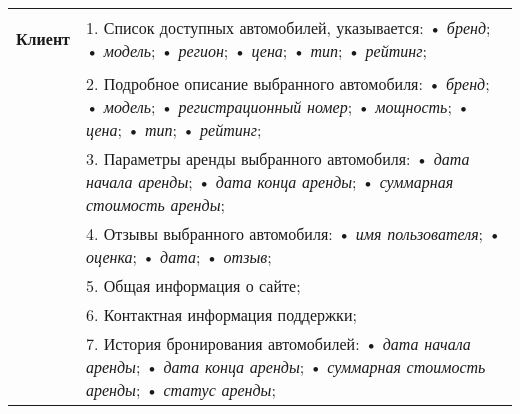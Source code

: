 \begin{longtable}{|p{0.5cm}|p{15.5cm}|}
	\begin{rotatebox}[origin=r]{90}
		{ \textbf{Клиент}}
	\end{rotatebox} 
	& 
	1. Список доступных автомобилей, указывается: \newline
	• \textit{бренд}; \newline
	• \textit{модель}; \newline
	• \textit{регион}; \newline
	• \textit{цена}; \newline
	• \textit{тип}; \newline
	• \textit{рейтинг}; \\
	\cline{2-2}
	
	&
	2. Подробное описание выбранного автомобиля: \newline
	• \textit{бренд}; \newline
	• \textit{модель}; \newline
	• \textit{регистрационный номер}; \newline
	• \textit{мощность}; \newline
	• \textit{цена}; \newline
	• \textit{тип}; \newline
	• \textit{рейтинг}; \\
	\cline{2-2}
	
	&
	3. Параметры аренды выбранного автомобиля:
	• \textit{дата начала аренды}; \newline
	• \textit{дата конца аренды}; \newline
	• \textit{суммарная стоимость аренды}; \\
	\cline{2-2}
	
	&
	4. Отзывы выбранного автомобиля: \newline
	• \textit{имя пользователя}; \newline
	• \textit{оценка}; \newline
	• \textit{дата}; \newline
	• \textit{отзыв}; \\
	\cline{2-2}
	
	&
	5. Общая информация о сайте; \\
	\cline{2-2}
	
	&
	6. Контактная информация поддержки; \\
	\cline{2-2}
	
	&
	7. История бронирования автомобилей:
	• \textit{дата начала аренды}; \newline
	• \textit{дата конца аренды}; \newline
	• \textit{суммарная стоимость аренды}; \newline
	• \textit{статус аренды};
	\\
	\hline
	

\end{longtable}
